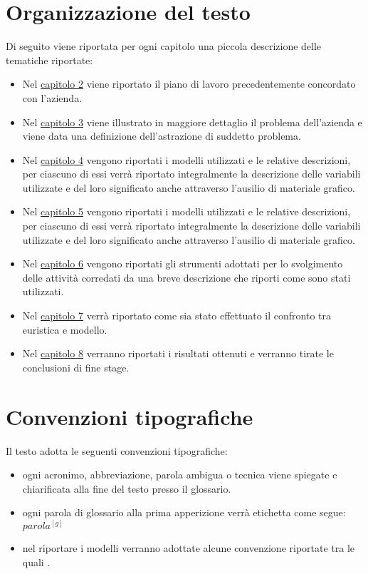 \section{Organizzazione del testo}
Di seguito viene riportata per ogni capitolo una piccola descrizione delle tematiche riportate:
\begin{itemize}
\item Nel \hyperlink{(chap:processi_metodologie)}{capitolo 2} viene riportato il piano di lavoro precedentemente concordato con l'azienda.
\item Nel \hyperlink{(chap:processi_metodologie)}{capitolo 3} viene illustrato in maggiore dettaglio il problema dell'azienda e viene data una  definizione dell'astrazione di suddetto problema.
\item Nel \hyperlink{(chap:processi_metodologie)}{capitolo 4} vengono riportati i modelli utilizzati e le relative descrizioni, per ciascuno di essi verrà riportato integralmente la descrizione delle variabili utilizzate e del loro significato anche attraverso l'ausilio di materiale grafico.
\item Nel \hyperlink{(chap:processi_metodologie)}{capitolo 5} vengono riportati i modelli utilizzati e le relative descrizioni, per ciascuno di essi verrà riportato integralmente la descrizione delle variabili utilizzate e del loro significato anche attraverso l'ausilio di materiale grafico.
\item Nel \hyperlink{(chap:processi_metodologie)}{capitolo 6} vengono riportati gli strumenti adottati per lo svolgimento delle attività corredati da una breve descrizione che riporti come sono stati utilizzati.
\item Nel \hyperlink{(chap:processi_metodologie)}{capitolo 7} verrà riportato come sia stato effettuato il confronto tra euristica e modello.
\item Nel \hyperlink{(chap:processi_metodologie)}{capitolo 8} verranno riportati i risultati ottenuti e verranno tirate le conclusioni di fine stage.
\end{itemize}
\section{Convenzioni tipografiche}
Il testo adotta le seguenti convenzioni tipografiche:
\begin{itemize}
    \item ogni acronimo, abbreviazione, parola ambigua o tecnica viene spiegate e chiarificata alla fine del testo presso il glossario.
    \item ogni parola di glossario alla prima apperizione verrà etichetta come segue: $parola^{[g]}$
    \item nel riportare i modelli verranno adottate alcune convenzione riportate tra le quali   .
\end{itemize}
